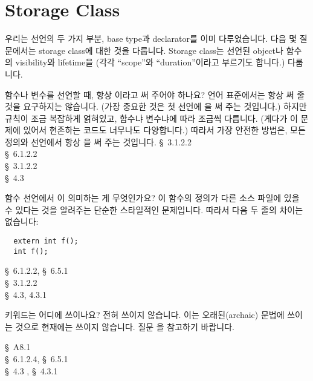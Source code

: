 \section{Storage Class}	\label{sec:storageclass}
우리는 선언의 두 가지 부분, base type과 declarator를 이미 다루었습니다. 
다음 몇 질문에서는 storage class에 대한 것을 다룹니다.  Storage class는
선언된 object나 함수의 visibility와 lifetime을 
(각각 ``scope''와 ``duration''이라고 부르기도 합니다.) 다룹니다.

\begin{faq}
         함수나 변수를 선언할 때, 항상 이라고 써 주어야
        하나요?
\A
        언어 표준에서는 항상 써 줄 것을 요구하지는 않습니다. (가장 중요한 
        것은 첫 선언에 을 써 주는 것입니다.) 하지만 규칙이 조금
        복잡하게 얽혀있고, 함수냐 변수냐에 따라 조금씩 다릅니다. (게다가 이
        문제에 있어서 현존하는 코드도 너무나도 다양합니다.)
        따라서 가장 안전한 방법은, 모든 정의와 선언에서 항상 을
        써 주는 것입니다.
\R
        \cite{ansi} \S\ 3.1.2.2 \\
        \cite{c89} \S\ 6.1.2.2 \\
        \cite{rationale} \S\ 3.1.2.2 \\
        \cite{hs} \S\ 4.3 
\end{faq}

\begin{faq}
	함수 선언에서 이 의미하는 게 무엇인가요?
\A 
	이 함수의 정의가 다른 소스 파일에 있을 수 있다는 것을 알려주는
	단순한 스타일적인 문제입니다.  따라서 다음 두 줄의 차이는 없습니다:

\begin{verbatim}
  extern int f();
  int f();
\end{verbatim}
\R
	\cite{c89} \S\ 6.1.2.2, \S\ 6.5.1 \\
	\cite{rationale} \S\ 3.1.2.2 \\
	\cite{hs} \S\ 4.3, 4.3.1 
\end{faq}

\begin{faq}
	 키워드는 어디에 쓰이나요?
\A 
	전혀 쓰이지 않습니다.  이는 오래된(archaic) 문법에 쓰이는 것으로
	현재에는 쓰이지 않습니다.  질문 을 참고하기 바랍니다.

\R
	\cite{kr1} \S\ A8.1  \\
	\cite{c89} \S\ 6.1.2.4, \S\ 6.5.1 \\
	\cite{hs} \S\ 4.3 , \S\ 4.3.1 
\end{faq}


